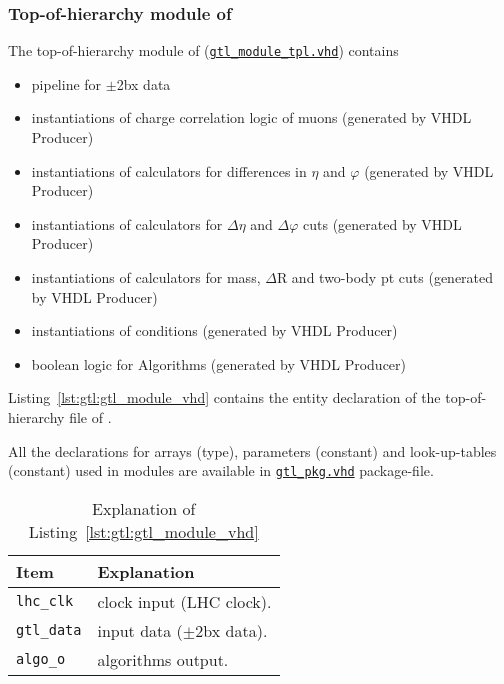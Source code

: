 \subsubsection{Top-of-hierarchy module of \ugtl}
\label{sec:gtl:top_module}

The top-of-hierarchy module of \ugtl (\href{\gitbranch/firmware/hdl/payload/gtl\_module\_tpl.vhd}{\texttt{\textquotesingle gtl\_module\_tpl.vhd\textquotesingle }}) contains
\begin {itemize}
\item pipeline for $\pm$2bx data
\item instantiations of charge correlation logic of muons (generated by VHDL Producer)
\item instantiations of calculators for differences in $\eta$ and $\varphi$ (generated by VHDL Producer)
\item instantiations of calculators for $\Delta\eta$ and $\Delta\varphi$ cuts  (generated by VHDL Producer)
\item instantiations of calculators for mass, $\Delta$R and two-body pt cuts  (generated by VHDL Producer)
\item instantiations of conditions (generated by VHDL Producer)
\item boolean logic for Algorithms (generated by VHDL Producer)
\end {itemize}

Listing~\ref{lst:gtl:gtl_module_vhd} contains the entity declaration of the top-of-hierarchy file of \ugtl.

All the declarations for arrays (\textquotesingle type\textquotesingle ), parameters (\textquotesingle constant\textquotesingle ) and look-up-tables (\textquotesingle constant\textquotesingle ) used in modules are available in \href{\gitbranch/firmware/hdl/packages/gtl_pkg.vhd}{\texttt{\textquotesingle gtl\_pkg.vhd\textquotesingle }} package-file.

\clearpage



\medskip
\begin{table}
\footnotesize
\caption{Explanation of Listing~\ref{lst:gtl:gtl_module_vhd}}
\vspace{5mm}
\centering
\begin{tabular}{l p{}}
\toprule
{Item} & {Explanation}\\
\midrule
\verb|lhc_clk| & clock input (LHC clock).\\
\verb|gtl_data| & input data ($\pm$2bx data).\\
\verb|algo_o| & algorithms output.\\
\bottomrule
\end{tabular}
\label{tab:gtl:explanation_fdl_module_vhd}
\end{table}

